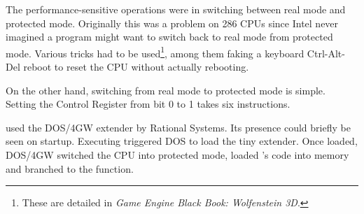 The performance-sensitive operations were in switching between real mode and protected mode. Originally this was a problem on 286 CPUs since Intel never imagined a program might want to switch back to real mode from protected mode. Various tricks had to be used\footnote{These are detailed in \textit{Game Engine Black Book: Wolfenstein 3D}.}, among them faking a keyboard Ctrl-Alt-Del reboot to reset the CPU without actually rebooting.\\
\par
On the other hand, switching from real mode to protected mode is simple. Setting the Control Register from bit 0 to 1 takes six instructions.\\
\par
{}
\par

\doom{} used the DOS/4GW extender by Rational Systems. Its presence could briefly be seen on startup. Executing  triggered DOS to load the tiny extender. Once loaded, DOS/4GW switched the CPU into protected mode, loaded \doom's code into memory and branched to the  function.\\
\par
{}





